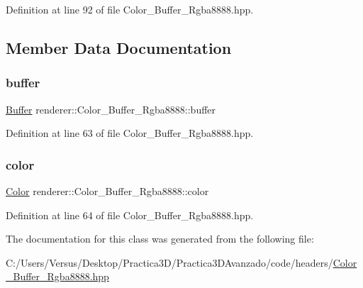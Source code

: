 Definition at line 92 of file Color\+\_\+\+Buffer\+\_\+\+Rgba8888.\+hpp.



\subsection{Member Data Documentation}
\mbox{\label{classrenderer_1_1_color___buffer___rgba8888_acfc34bd2581783f762947288575df15f}} 
\subsubsection{\texorpdfstring{buffer}{buffer}}
{\footnotesize\ttfamily \mbox{\hyperlink{classrenderer_1_1_color___buffer___rgba8888_a248c7412d48617fba678f54cd0417b8d}{Buffer}} renderer\+::\+Color\+\_\+\+Buffer\+\_\+\+Rgba8888\+::buffer\hspace{0.3cm}{\ttfamily [private]}}



Definition at line 63 of file Color\+\_\+\+Buffer\+\_\+\+Rgba8888.\+hpp.

\mbox{\label{classrenderer_1_1_color___buffer___rgba8888_ac56a7f51930995250260ca7b55681295}} 
\subsubsection{\texorpdfstring{color}{color}}
{\footnotesize\ttfamily \mbox{\hyperlink{structrenderer_1_1_color___buffer___rgba8888_1_1_color}{Color}} renderer\+::\+Color\+\_\+\+Buffer\+\_\+\+Rgba8888\+::color\hspace{0.3cm}{\ttfamily [private]}}



Definition at line 64 of file Color\+\_\+\+Buffer\+\_\+\+Rgba8888.\+hpp.



The documentation for this class was generated from the following file\+:\begin{DoxyCompactItemize}
\item 
C\+:/\+Users/\+Versus/\+Desktop/\+Practica3\+D/\+Practica3\+D\+Avanzado/code/headers/\mbox{\hyperlink{_color___buffer___rgba8888_8hpp}{Color\+\_\+\+Buffer\+\_\+\+Rgba8888.\+hpp}}\end{DoxyCompactItemize}
